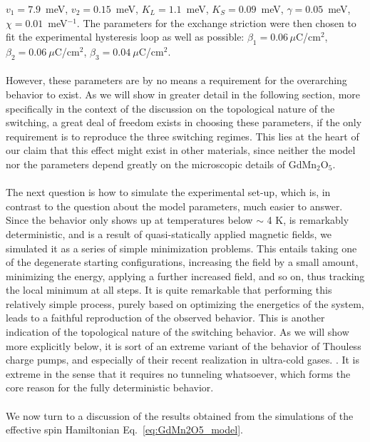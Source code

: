 $v_1 = 7.9$~meV, $v_2 = 0.15$~meV, $K_L = 1.1$~meV, $K_S = 0.09$~meV, $\gamma = 0.05$~meV, $\chi=0.01$~meV$^{-1}$.
The parameters for the exchange striction were then chosen to fit the experimental hysteresis loop as well as possible:
${\beta_1 = 0.06\,\mu}$C/cm$^2$, $\beta_2 = 0.06\:\mu$C/cm$^2$, $\beta_3 = 0.04\:\mu$C/cm$^2$.
\\\\
However, these parameters are by no means a requirement for the overarching behavior to exist. As we will show in greater detail in the following section, more specifically in the context of the discussion on the topological nature of the switching, a great deal of freedom exists in choosing these parameters, if the only requirement is to reproduce the three switching regimes.
This lies at the heart of our claim that this effect might exist in other materials, since neither the model nor the parameters depend greatly on the microscopic details of GdMn$_2$O$_5$. 
\\\\
The next question is how to simulate the experimental set-up, which is, in contrast to the question about the model parameters, much easier to answer.
Since the behavior only shows up at temperatures below $\sim$ 4 K, is remarkably deterministic, and is a result of quasi-statically applied magnetic fields, we simulated it as a series of simple minimization problems.
This entails taking one of the degenerate starting configurations, increasing the field by a small amount, minimizing the energy, applying a further increased field, and so on, thus tracking the local minimum at all steps.
It is quite remarkable that performing this relatively simple process, purely based on optimizing the energetics of the system, leads to a faithful reproduction of the observed behavior.
This is another indication of the topological nature of the switching behavior.
As we will show more explicitly below, it is sort of an extreme variant of the behavior of Thouless charge pumps, and especially of their recent realization in ultra-cold gases. \cite{Rice82,Thouless1982,Thouless83,Lohse16,Nakajima16, Atala13}.
It is extreme in the sense that it requires no tunneling whatsoever, which forms the core reason for the fully deterministic behavior.
\\\\

We now turn to a discussion of the results obtained from the simulations of the effective spin Hamiltonian Eq.~\eqref{eq:GdMn2O5_model}.

